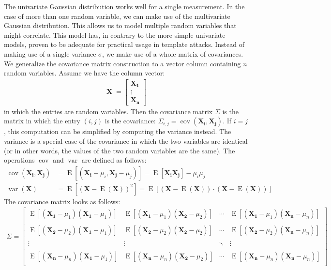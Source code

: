 The univariate Gaussian distribution works well for a single measurement.
In the case of more than one random variable, we can make use of the multivariate Gaussian distribution. 
This allows us to model multiple random variables that might correlate.
This model has, in contrary to the more simple univariate models, proven to be adequate for practical usage in template attacks.
Instead of making use of a single variance $\sigma$, we make use of a whole matrix of covariances.
We generalize the covariance matrix construction to a vector column containing $n$ random variables.
Assume we have the column vector:
%
\begin{align*}
\operatorname{\textbf{X}} =
\begin{bmatrix}
\bm{X_1} \\
\vdots \\
\bm{X_n}
\end{bmatrix}
\end{align*}
%
in which the entries are random variables.
Then the covariance matrix $\Sigma$ is the matrix in which the entry $(i, j)$ is the covariance: $\Sigma_{i, j} = \operatorname{cov}(\bm{X_i}, \bm{X_j})$. If $i = j$, this computation can be simplified by computing the variance instead.
The variance is a special case of the covariance in which the two variables are identical (or in other words, the values of the two random variables are the same).
The operations $\operatorname{cov}$ and $\operatorname{var}$ are defined as follows:
%
\begin{align*}
\operatorname{cov}(\bm{X_i}, \bm{X_j}) &= \operatorname{E} \left[ (\bm{X_i} - \mu_i, \bm{X_j}  - \mu_j) \right] = \operatorname{E} \left[ \bm{X_i X_j} \right] - \mu_i \mu_j \\
\operatorname{var}(\bm{X}) &= \operatorname{E} \left[ ( \bm{X} - \operatorname{E}(\bm{X}))^2  \right] = \operatorname{E} \left[(\bm{X} - \operatorname{E}(\bm{X})) \cdot (\bm{X} - \operatorname{E}(\bm{X})) \right]
\end{align*}
%
The covariance matrix looks as follows:
%
\begin{align*}
\Sigma = 
\begin{bmatrix}
\operatorname{E} \left[ (\bm{X_1} - \mu_1) (\bm{X_1} - \mu_1) \right] & \operatorname{E} \left[ (\bm{X_1} - \mu_1) (\bm{X_2} - \mu_2) \right] & \dotsm & \operatorname{E} \left[ (\bm{X_1} - \mu_1) (\bm{X_n} - \mu_n) \right] \\
& & & \\
%
\operatorname{E} \left[ (\bm{X_2} - \mu_2) (\bm{X_1} - \mu_1) \right] & \operatorname{E} \left[ (\bm{X_2} - \mu_2) (\bm{X_2} - \mu_2) \right] & \dotsm & \operatorname{E} \left[ (\bm{X_2} - \mu_2) (\bm{X_n} - \mu_n) \right] \\
& & & \\
%
\vdots & \vdots & \ddots & \vdots \\
& & & \\
%
\operatorname{E} \left[ (\bm{X_n} - \mu_n) (\bm{X_1} - \mu_1) \right] & \operatorname{E} \left[ (\bm{X_n} - \mu_n) (\bm{X_2} - \mu_2) \right] & \dotsm & \operatorname{E} \left[ (\bm{X_n} - \mu_n) (\bm{X_n} - \mu_n) \right] \\
%
\end{bmatrix}
\end{align*}
